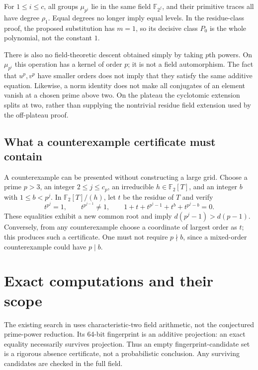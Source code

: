 \documentclass[a4paper]{article}
\newcommand{\F}{\mathbb F}
\begin{document}
For $1\leq i\leq c$, all groups $\mu_{p^i}$ lie in the same field
$\F_{2^f}$, and their primitive traces all have degree $\rho_1$.
Equal degrees no longer imply equal levels.
In the residue-class proof, the proposed substitution has $m=1$,
so its decisive class $P_0$ is the whole polynomial, not the constant
$1$.

There is also no field-theoretic descent obtained simply by taking
$p$th powers.  On $\mu_{p^i}$ this operation has a kernel of order $p$;
it is not a field automorphism.  The fact that $u^p,v^p$ have smaller
orders does not imply that they satisfy the same additive equation.
Likewise, a norm identity does not make all conjugates of an element
vanish at a chosen prime above two.  On the plateau the cyclotomic
extension splits at two, rather than supplying the nontrivial residue
field extension used by the off-plateau proof.

\subsection{What a counterexample certificate must contain}

A counterexample can be presented without constructing a large grid.
Choose a prime $p>3$, an integer $2\leq j\leq c_p$, an irreducible
$h\in\F_2[T]$, and an integer $b$ with $1\leq b<p^j$.  In
$\F_2[T]/(h)$, let $t$ be the residue of $T$ and verify
\[
 t^{p^j}=1,\qquad t^{p^{j-1}}\ne1,\qquad
 1+t+t^{p^j-1}+t^b+t^{p^j-b}=0.
\]
These equalities exhibit a new common root and imply
$d(p^j-1)>d(p-1)$.
Conversely, from any counterexample choose a coordinate of largest
order as $t$; this produces such a certificate.
One must not require $p\nmid b$, since a mixed-order counterexample
could have $p\mid b$.

\section{Exact computations and their scope}\label{sec:computations}

The existing search in \cite{code} uses characteristic-two field
arithmetic, not the conjectured prime-power reduction.
Its 64-bit fingerprint is an additive projection: an exact equality
necessarily survives projection.  Thus an empty fingerprint-candidate
set is a rigorous absence certificate, not a probabilistic conclusion.
Any surviving candidates are checked in the full field.
\end{document}
